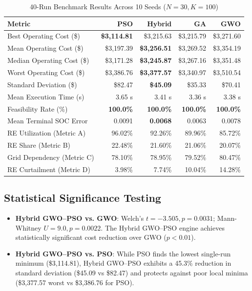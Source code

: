 \documentclass[journal,10pt,twocolumn]{IEEEtran}
\begin{document}
\begin{table}[htbp]
\caption{40-Run Benchmark Results Across 10 Seeds ($N=30, K=100$)}
\label{tab:results}
\centering
\scriptsize
\begin{tabular}{lrrrr}
\toprule
\textbf{Metric} & \textbf{PSO} & \textbf{Hybrid} & \textbf{GA} & \textbf{GWO} \\
\midrule
Best Operating Cost (\$) & \textbf{\$3,114.81} & \$3,215.63 & \$3,215.79 & \$3,271.60 \\
Mean Operating Cost (\$) & \$3,197.39 & \textbf{\$3,256.51} & \$3,269.52 & \$3,354.19 \\
Median Operating Cost (\$) & \$3,171.28 & \textbf{\$3,245.87} & \$3,267.16 & \$3,351.48 \\
Worst Operating Cost (\$) & \$3,386.76 & \textbf{\$3,377.57} & \$3,340.97 & \$3,510.54 \\
Standard Deviation (\$) & \$82.47 & \textbf{\$45.09} & \$35.33 & \$70.41 \\
Mean Execution Time (s) & 3.65 s & 3.41 s & 3.36 s & 3.38 s \\
Feasibility Rate (\%) & \textbf{100.0\%} & \textbf{100.0\%} & \textbf{100.0\%} & \textbf{100.0\%} \\
Mean Terminal SOC Error & 0.0091 & \textbf{0.0068} & 0.0063 & 0.0078 \\
RE Utilization (Metric A) & 96.02\% & 92.26\% & 89.96\% & 85.72\% \\
RE Share (Metric B) & 22.48\% & 21.60\% & 21.06\% & 20.07\% \\
Grid Dependency (Metric C) & 78.10\% & 78.95\% & 79.52\% & 80.47\% \\
RE Curtailment (Metric D) & 3.98\% & 7.74\% & 10.04\% & 14.28\% \\
\bottomrule
\end{tabular}
\end{table}

\subsection{Statistical Significance Testing}
\begin{itemize}
    \item \textbf{Hybrid GWO--PSO vs. GWO}: Welch's $t = -3.505, p = 0.0031$; Mann-Whitney $U = 9.0, p = 0.0022$. The Hybrid GWO--PSO engine achieves statistically significant cost reduction over GWO ($p < 0.01$).
    \item \textbf{Hybrid GWO--PSO vs. PSO}: While PSO finds the lowest single-run minimum (\$3,114.81), Hybrid GWO--PSO exhibits a 45.3\% reduction in standard deviation (\$45.09 vs \$82.47) and protects against poor local minima (\$3,377.57 worst vs \$3,386.76 for PSO).
\end{itemize}
\end{document}
